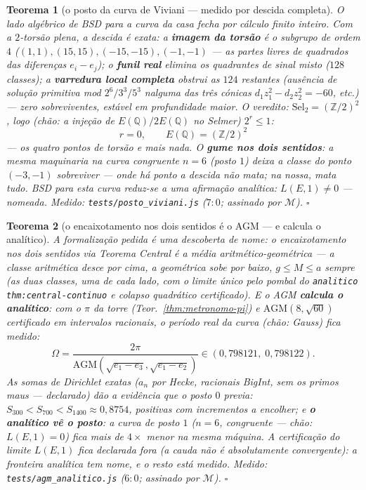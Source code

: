 \documentclass[11pt,a4paper]{article}
\newtheorem{teorema}{Teorema}
\newcommand{\code}[1]{\texttt{\small #1}}
\begin{document}
\begin{teorema}[o posto da curva de Viviani --- medido por descida
completa]\label{thm:posto}
O lado algébrico de BSD para a curva da casa fecha por cálculo finito
inteiro. Com a $2$-torsão plena, a descida é exata: a \textbf{imagem
da torsão} é o subgrupo de ordem $4$
($(1,1),(15,15),(-15,-15),(-1,-1)$ --- as partes livres de quadrados
das diferenças $e_{i}-e_{j}$); o \textbf{funil real} elimina os
quadrantes de sinal misto ($128$ classes); a \textbf{varredura local
completa} obstrui as $124$ restantes (ausência de solução primitiva
mod $2^{6}/3^{3}/5^{3}$ nalguma das três cónicas
$d_{1}z_{1}^{2}-d_{2}z_{2}^{2}=-60$, etc.) --- \emph{zero
sobreviventes}, estável em profundidade maior. O veredito:
$\mathrm{Sel}_{2}=(\mathbb{Z}/2)^{2}$, logo (chão: a injeção de
$E(\mathbb{Q})/2E(\mathbb{Q})$ no Selmer) $2^{r}\le1$:
\[
\boxed{\;r=0,\qquad E(\mathbb{Q})=(\mathbb{Z}/2)^{2}\;}
\]
--- os quatro pontos de torsão e mais nada. O \textbf{gume nos dois
sentidos}: a mesma maquinaria na curva congruente $n{=}6$ (posto $1$)
deixa a classe do ponto $(-3,-1)$ \emph{sobreviver} --- onde há ponto
a descida não mata; na nossa, mata tudo. \emph{BSD para esta curva
reduz-se a uma afirmação analítica: $L(E,1)\ne0$ --- nomeada.}
\emph{Medido:} \code{tests/posto\_viviani.js} ($7{:}0$; assinado por
$\mathcal{M}$).
$\square$
\end{teorema}

\begin{teorema}[o encaixotamento nos dois sentidos é o AGM --- e
calcula o analítico]\label{thm:agm-analitico}
A formalização pedida é uma descoberta de nome: \emph{o encaixotamento
nos dois sentidos via Teorema Central é a média
aritmético-geométrica} --- a classe aritmética desce por cima, a
geométrica sobe por baixo, $g\le M\le a$ sempre (as duas classes,
uma de cada lado, com o limite único pelo pombal do
\code{analitico thm:central-continuo} e colapso quadrático certificado).
E o AGM \textbf{calcula o analítico}: com o $\pi$ da torre
(Teor.~\ref{thm:metronomo-pi}) e $\mathrm{AGM}(8,\sqrt{60})$
certificado em intervalos racionais, o período real da curva
(chão: Gauss) fica medido:
\[
\Omega=\frac{2\pi}{\mathrm{AGM}(\sqrt{e_{1}-e_{3}},\sqrt{e_{1}-e_{2}})}
\in(0{,}798121,\;0{,}798122).
\]
As somas de Dirichlet \emph{exatas} ($a_{n}$ por Hecke, racionais
BigInt, sem os primos maus --- declarado) dão a evidência que o posto
$0$ previa: $S_{300}<S_{700}<S_{1400}\approx0{,}8754$, positivas com
incrementos a encolher; e \textbf{o analítico vê o posto}: a curva de
posto $1$ ($n{=}6$, congruente --- chão: $L(E,1)=0$) fica mais de
$4\times$ menor na mesma máquina. A certificação do limite $L(E,1)$
fica declarada fora (a cauda não é absolutamente convergente): a
fronteira analítica tem nome, e o resto está medido.
\emph{Medido:} \code{tests/agm\_analitico.js} ($6{:}0$; assinado por
$\mathcal{M}$).
$\square$
\end{teorema}
\end{document}

